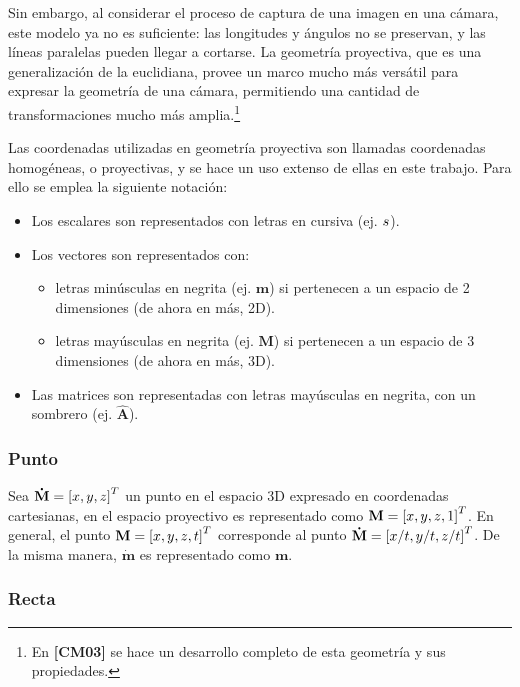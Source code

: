 \documentclass[11pt,a4paper,titlepage]{article}
\newcommand{\Cite}[1]{\textbf{[#1]}}
\newcommand{\Scalar}[1]{\ensuremath{\mathnormal{#1}}}
\newcommand{\Two}[1]{\ensuremath{\mathbf{#1}}}
\newcommand{\Three}[1]{\ensuremath{\mathbf{#1}}}
\newcommand{\Mat}[1]{\ensuremath{\mathbf{\hat{#1}}}}
\newcommand{\TwoCart}[1]{\ensuremath{\mathbf{\dot{#1}}}}
\newcommand{\ThreeCart}[1]{\ensuremath{\mathbf{\dot{#1}}}}
\newcommand{\Vector}[1]{\ensuremath{\left[#1\right]^T}}
\begin{document}
Sin embargo, al considerar el proceso de captura de una imagen en una cámara, este modelo ya no es suficiente: las longitudes y ángulos no se preservan, y las líneas paralelas pueden llegar a cortarse. La geometría proyectiva, que es una generalización de la euclidiana, provee un marco mucho más versátil para expresar la geometría de una cámara, permitiendo una cantidad de transformaciones mucho más amplia.\footnote{En \Cite{CM03} se hace un desarrollo completo de esta geometría y sus propiedades.}

Las coordenadas utilizadas en geometría proyectiva son llamadas coordenadas homogéneas, o proyectivas, y se hace un uso extenso de ellas en este trabajo. Para ello se emplea la siguiente notación:

\begin{itemize}
	\item Los escalares son representados con letras en cursiva (ej. \Scalar{s}).
	\item Los vectores son representados con:
	\begin{itemize}
		\item letras minúsculas en negrita (ej. \Two{m}) si pertenecen a un espacio de 2 dimensiones (de ahora en más, 2D).
		\item letras mayúsculas en negrita (ej. \Three{M}) si pertenecen a un espacio de 3 dimensiones (de ahora en más, 3D).
	\end{itemize}
	\item Las matrices son representadas con letras mayúsculas en negrita, con un sombrero (ej. \Mat{A}).
\end{itemize}

\subsubsection{Punto}

Sea $\ThreeCart{M} = \Vector{\Scalar{x}, \Scalar{y}, \Scalar{z}}$ un punto en el espacio 3D expresado en coordenadas cartesianas, en el espacio proyectivo es representado como $\Three{M} = \Vector{\Scalar{x}, \Scalar{y}, \Scalar{z}, 1}$. En general, el punto $\Three{M} = \Vector{\Scalar{x}, \Scalar{y}, \Scalar{z}, \Scalar{t}}$ corresponde al punto $\ThreeCart{M} = \Vector{\Scalar{x}/\Scalar{t}, \Scalar{y}/\Scalar{t}, \Scalar{z}/\Scalar{t}}$. De la misma manera, \TwoCart{m} es representado como \Two{m}.

\subsubsection{Recta}
\end{document}
